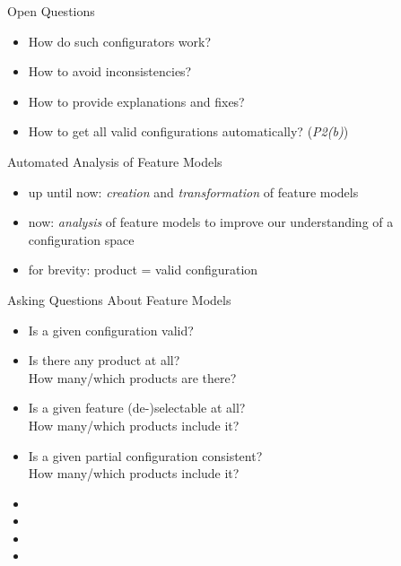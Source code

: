 \begin{frame}{\myframetitle}
	\begin{fancycolumns}
		\begin{note}{Open Questions}
			\begin{itemize}
				\item How do such configurators work?
				\item How to avoid inconsistencies?
				\item How to provide explanations and fixes?
    			\item How to get all valid configurations automatically? (\emph{P2(b)})
			\end{itemize}
		\end{note}
		\begin{definition}{Automated Analysis of Feature Models}
			\begin{itemize}
				\item up until now: \emph{creation} and \emph{transformation} of feature models
				\item now: \emph{analysis} of feature models to improve our understanding of a configuration space
				\item for brevity: product = valid configuration
			\end{itemize}
		\end{definition}
	\nextcolumn
		\begin{example}{Asking Questions About Feature Models}
			\begin{itemize}
				\item Is a given configuration valid?
				\item Is there any product at all?\\
					How many/which products are there?\\
				\item Is a given feature (de-)selectable at all?\\
					How many/which products include it?\\
				\item Is a given partial configuration consistent?\\
					How many/which products include it?\\
				\item \color{gray}{(Which features always occur together?)}
				\item \color{gray}{(Is a given constraint redundant?)}
				\item \color{gray}{(How do two feature model versions differ?)}
				\item \color{gray}{(Why is \ldots? How to fix \ldots?)}
			\end{itemize}
		\end{example}
	\end{fancycolumns}
\end{frame}

